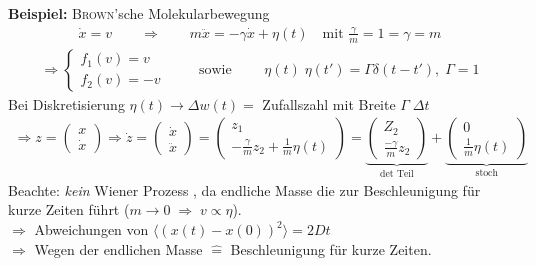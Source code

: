 \documentclass[12pt]{article}
\begin{document}
\textbf{Beispiel:} \textsc{Brown}'sche Molekularbewegung 
\begin{align*}
\dot{x}=v \qquad \Rightarrow \qquad m \ddot{x}= - \gamma \dot{x} + \eta (t)  \quad \text{mit } \frac{\gamma}{m}= 1 = \gamma = m
\end{align*}
\begin{align*} \Rightarrow
\begin{cases}
f_1 (v) = v \\
f_2 (v) = -v
\end{cases} \qquad \text{ sowie } \qquad \eta (t) \; \eta (t')= \Gamma \delta (t-t'), \; \Gamma =1
\end{align*}
Bei Diskretisierung $\eta (t) \to \Delta w(t)=$ Zufallszahl mit Breite $\Gamma\;  \Delta t$
\begin{align*}
\Rightarrow z= 
\begin{pmatrix}x\\ \dot{x}\end{pmatrix} 
\Rightarrow  \dot{z} = \begin{pmatrix} \dot{x}\\ \ddot{x}\end{pmatrix} = \begin{pmatrix}z_1\\ - \frac{\gamma}{m} z_2 + \frac{1}{m} \eta (t)\end{pmatrix} = 
\underbrace{\begin{pmatrix} Z_2 \\ \frac{-\gamma}{m} z_2 \end{pmatrix} }_\text{det Teil}+\underbrace{ \begin{pmatrix} 0\\ \frac{1}{m} \eta (t)\end{pmatrix} }_\text{stoch}
\end{align*}
Beachte: \textit{kein} Wiener Prozess , da endliche Masse die zur Beschleunigung für kurze Zeiten führt ($m \to 0 \; \Rightarrow \; v \propto \eta$). \\
$\Rightarrow$ Abweichungen von $\langle ( x(t) - x(0))^2 \rangle = 2Dt$\\
$\Rightarrow$ Wegen der endlichen Masse $\widehat{=}$ Beschleunigung für kurze Zeiten.
\end{document}
